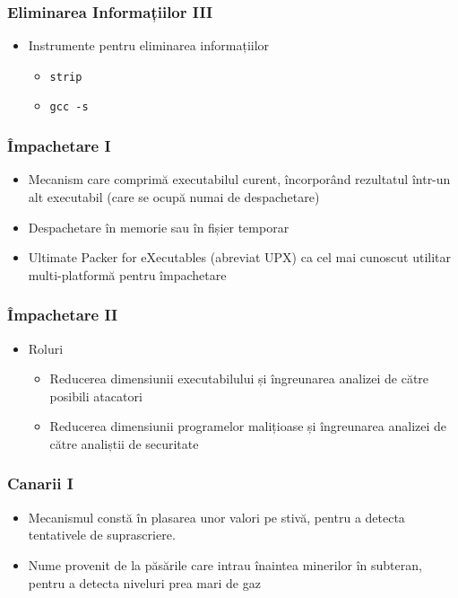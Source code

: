 \documentclass[xcolor={table}]{beamer}
\begin{document}
	\begin{frame}
		\frametitle{Eliminarea Informațiilor III}\pause
	    \begin{itemize}[<+->]
			\item Instrumente pentru eliminarea informațiilor
			    \begin{itemize}
			        \item \texttt{strip}
			        \item \texttt{gcc -s}
			    \end{itemize}
		\end{itemize}
	\end{frame}
	
	\begin{frame}
		\frametitle{Împachetare I}\pause
		\begin{itemize}[<+->]
		    \item Mecanism care comprimă executabilul curent, încorporând rezultatul într-un alt executabil (care se ocupă numai de despachetare)
		    \item Despachetare în memorie sau în fișier temporar
		    \item Ultimate Packer for eXecutables (abreviat UPX) ca cel mai cunoscut utilitar multi-platformă pentru împachetare
        \end{itemize}
    \end{frame}
    
    \begin{frame}
		\frametitle{Împachetare II}\pause
		\begin{itemize}[<+->]
		    \item Roluri
		        \begin{itemize}
			        \item Reducerea dimensiunii executabilului și îngreunarea analizei de către posibili atacatori
			        \item Reducerea dimensiunii programelor malițioase și îngreunarea analizei de către analiștii de securitate
			    \end{itemize}
        \end{itemize}
    \end{frame}
    
    \begin{frame}
		\frametitle{Canarii I}\pause
		\begin{itemize}[<+->]
		    \item Mecanismul constă în plasarea unor valori pe stivă, pentru a detecta tentativele de suprascriere.
		    \item Nume provenit de la păsările care intrau înaintea minerilor în subteran, pentru a detecta niveluri prea mari de gaz
        \end{itemize}
    \end{frame}
    
\end{document}
